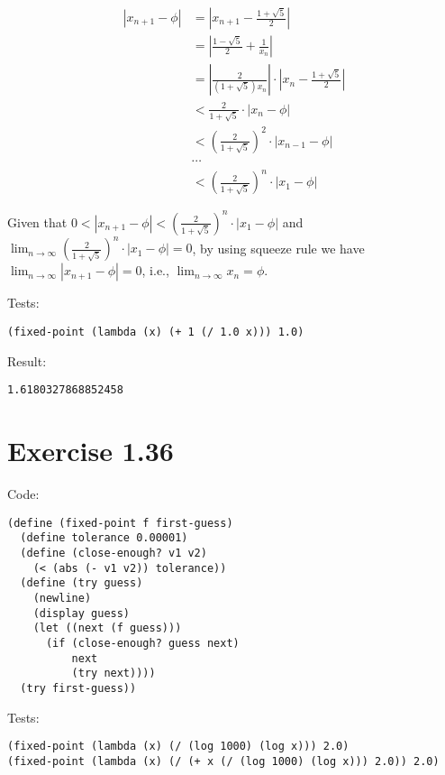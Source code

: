 \documentclass[../main.tex]{subfiles}
\begin{document}
\begin{align*}
|x_{n+1}-\phi| &= \left|x_{n+1}-\frac{1+\sqrt{5}}{2}\right| \\
&= \left|\frac{1-\sqrt{5}}{2}+\frac{1}{x_n}\right| \\
&= \left|\frac{2}{(1+\sqrt{5})x_n}\right|\cdot\left|x_n - \frac{1+\sqrt{5}}{2}\right| \\
&< \frac{2}{1+\sqrt{5}}\cdot|x_n - \phi| \\
&< \left(\frac{2}{1+\sqrt{5}}\right)^2\cdot|x_{n-1} - \phi| \\
&\cdots \\
&< \left(\frac{2}{1+\sqrt{5}}\right)^n\cdot|x_1 - \phi|
\end{align*}

Given that $0<|x_{n+1}-\phi|<\left(\frac{2}{1+\sqrt{5}}\right)^n\cdot|x_1 - \phi|$ and $\lim_{n\to\infty}\left(\frac{2}{1+\sqrt{5}}\right)^n\cdot|x_1 - \phi|=0$, by using squeeze rule we have $\lim_{n\to\infty}|x_{n+1}-\phi|=0$, i.e., $\lim_{n\to\infty}x_n=\phi$.

Tests:

\begin{lstlisting}
(fixed-point (lambda (x) (+ 1 (/ 1.0 x))) 1.0)
\end{lstlisting}

Result:

\begin{lstlisting}
1.6180327868852458
\end{lstlisting}

\section{Exercise 1.36}

Code:

\begin{lstlisting}
(define (fixed-point f first-guess)
  (define tolerance 0.00001)
  (define (close-enough? v1 v2)
    (< (abs (- v1 v2)) tolerance))
  (define (try guess)
    (newline)
    (display guess)
    (let ((next (f guess)))
      (if (close-enough? guess next)
          next
          (try next))))
  (try first-guess))
\end{lstlisting}

Tests:

\begin{lstlisting}
(fixed-point (lambda (x) (/ (log 1000) (log x))) 2.0)
(fixed-point (lambda (x) (/ (+ x (/ (log 1000) (log x))) 2.0)) 2.0)
\end{lstlisting}
\end{document}
